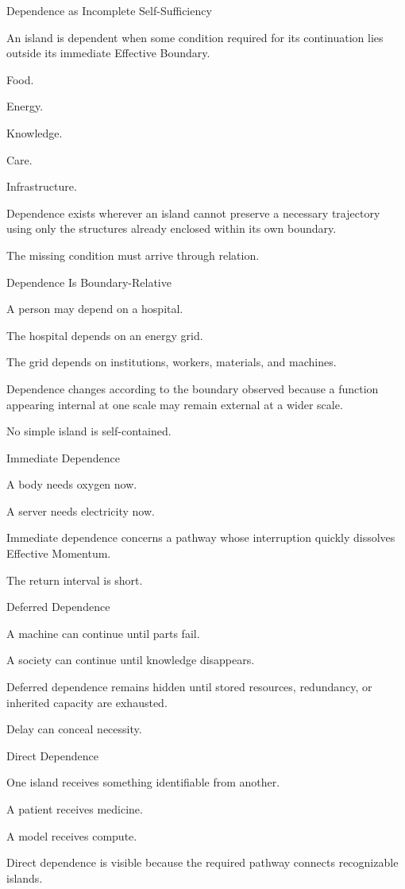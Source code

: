 Dependence as Incomplete Self-Sufficiency

An island is dependent when some condition required for its continuation lies outside its immediate Effective Boundary.

Food.

Energy.

Knowledge.

Care.

Infrastructure.

Dependence exists wherever an island cannot preserve a necessary trajectory using only the structures already enclosed within its own boundary.

The missing condition must arrive through relation.

Dependence Is Boundary-Relative

A person may depend on a hospital.

The hospital depends on an energy grid.

The grid depends on institutions, workers, materials, and machines.

Dependence changes according to the boundary observed because a function appearing internal at one scale may remain external at a wider scale.

No simple island is self-contained.

Immediate Dependence

A body needs oxygen now.

A server needs electricity now.

Immediate dependence concerns a pathway whose interruption quickly dissolves Effective Momentum.

The return interval is short.

Deferred Dependence

A machine can continue until parts fail.

A society can continue until knowledge disappears.

Deferred dependence remains hidden until stored resources, redundancy, or inherited capacity are exhausted.

Delay can conceal necessity.

Direct Dependence

One island receives something identifiable from another.

A patient receives medicine.

A model receives compute.

Direct dependence is visible because the required pathway connects recognizable islands.

